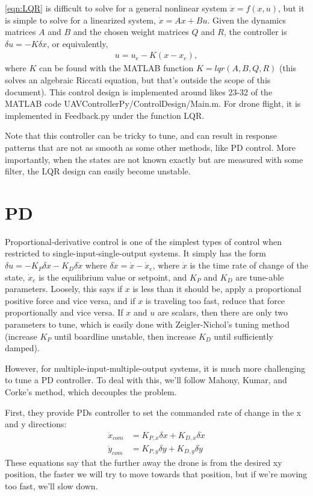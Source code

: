 \documentclass[10pt]{article}
\begin{document}
	\autoref{eqn:LQR} is difficult to solve for a general nonlinear system $\dot{x} = f(x,u)$, but it is simple to solve for a linearized system, $\dot{x} = Ax + Bu$. Given the dynamics matrices $A$ and $B$ and the chosen weight matrices $Q$ and $R$, the controller is $\delta u = -K\delta x$, or equivalently, 
	\begin{align*}
		u = u_e - K(x-x_e),
	\end{align*}
	where $K$ can be found with the MATLAB function $K = lqr(A,B,Q,R)$ (this solves an algebraic Riccati equation, but that's outside the scope of this document). This control design is implemented around likes 23-32 of the MATLAB code UAVControllerPy/ControlDesign/Main.m. For drone flight, it is implemented in Feedback.py under the function LQR.
	
	Note that this controller can be tricky to tune, and can result in response patterns that are not as smooth as some other methods, like PD control. More importantly, when the states are not known exactly but are measured with some filter, the LQR design can easily become unstable.
	
	\section{PD}
	
	Proportional-derivative control is one of the simplest types of control when restricted to single-input-single-output systems. It simply has the form
		$\delta u = -K_P\delta x - K_D \delta \dot{x} $
	where $\delta \dot{x} = \dot{x} - \dot{x}_e$, where $\dot{x}$ is the time rate of change of the state, $\dot{x}_e$ is the equilibrium value or setpoint, and $K_P$ and $K_D$ are tune-able parameters. Loosely, this says if $x$ is less than it should be, apply a proportional positive force and vice versa, and if $x$ is traveling too fast, reduce that force proportionally and vice versa. If $x$ and $u$ are scalars, then there are only two parameters to tune, which is easily done with Zeigler-Nichol's tuning method (increase $K_P$ until boardline unstable, then increase $K_D$ until sufficiently damped). 
	
	However, for multiple-input-multiple-output systems, it is much more challenging to tune a PD controller. To deal with this, we'll follow Mahony, Kumar, and Corke's method, which decouples the problem. 
	
	First, they provide PDs controller to set the commanded rate of change in the x and y directions:
	\begin{align*}
		\ddot{x}_{com} &= K_{P,x}\delta x + K_{D,x}\delta \dot{x} \\
		\ddot{y}_{com} &= K_{P,y}\delta y + K_{D,y}\delta \dot{y}
	\end{align*}
	These equations say that the further away the drone is from the desired xy position, the faster we will try to move towards that position, but if we're moving too fast, we'll slow down.
	
\end{document}
